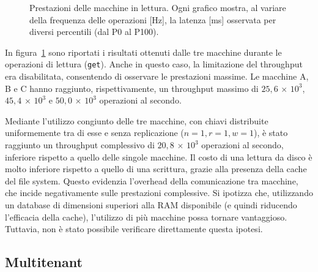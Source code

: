 \begin{figure}[htbp]
    \caption{Prestazioni delle macchine in lettura. Ogni grafico mostra, al variare della frequenza delle operazioni [Hz], la latenza [ms] osservata per diversi percentili (dal P0 al P100).}
    \label{fig:bench-get}
\end{figure}

In figura~\ref{fig:bench-get} sono riportati i risultati ottenuti dalle tre macchine durante le operazioni di lettura (\texttt{get}).
Anche in questo caso, la limitazione del throughput era disabilitata, consentendo di osservare le prestazioni massime.
Le macchine A, B e C hanno raggiunto, rispettivamente, un throughput massimo di $25{,}6\,{\times}\,10^3$, $45{,}4\,{\times}\,10^3$ e $50{,}0\,{\times}\,10^3$ operazioni al secondo.

Mediante l'utilizzo congiunto delle tre macchine, con chiavi distribuite uniformemente tra di esse e senza replicazione ($n=1, r=1, w=1$), è stato raggiunto un throughput complessivo di $20{,}8\,{\times}\,10^3$ operazioni al secondo, inferiore rispetto a quello delle singole macchine.
Il costo di una lettura da disco è molto inferiore rispetto a quello di una scrittura, grazie alla presenza della cache del file system.
Questo evidenzia l'overhead della comunicazione tra macchine, che incide negativamente sulle prestazioni complessive.
Si ipotizza che, utilizzando un database di dimensioni superiori alla RAM disponibile (e quindi riducendo l'efficacia della cache), l'utilizzo di più macchine possa tornare vantaggioso.
Tuttavia, non è stato possibile verificare direttamente questa ipotesi.

\subsection{Multitenant}
\label{subsec:risultati-multitenant}


